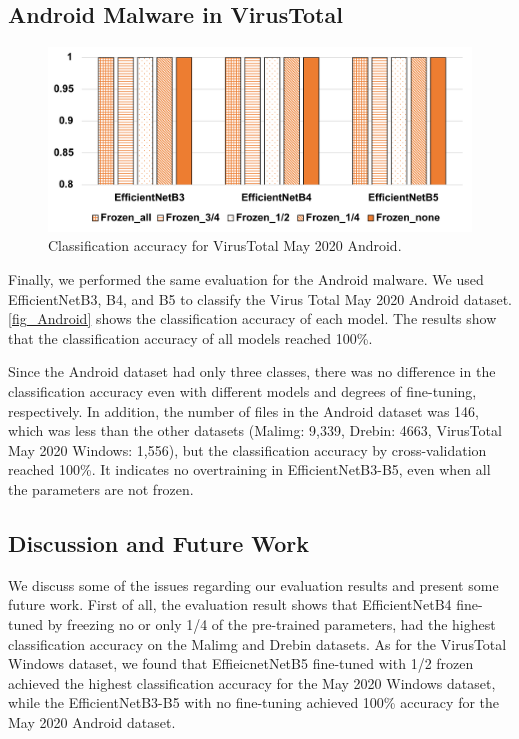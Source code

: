 \documentclass[conference]{IEEEtran}
\begin{document}
\subsection{Android Malware in VirusTotal}

\begin{figure}[t]
  \centering
  \includegraphics[width=\linewidth,clip]{Android.pdf}
  \caption{Classification accuracy for VirusTotal May 2020 Android.}
  \label{fig_Android}
\end{figure}

Finally, we performed the same evaluation for the Android malware.
We used EfficientNetB3, B4, and B5 to classify the Virus Total May 2020 Android dataset. 
\autoref{fig_Android} shows the classification accuracy of each model. The results show that the classification accuracy of all models reached 100\%. 

Since the Android dataset had only three classes, there was no difference in the classification accuracy even with different models and degrees of fine-tuning, respectively.
In addition, the number of files in the Android dataset was 146, which was less than the other datasets (Malimg: 9,339, Drebin: 4663, VirusTotal May 2020 Windows: 1,556), but the classification accuracy by cross-validation reached 100\%. It indicates no overtraining in EfficientNetB3-B5, even when all the parameters are not frozen.

\subsection{Discussion and Future Work}

We discuss some of the issues regarding our evaluation results and present some future work.
First of all, the evaluation result shows that EfficientNetB4 fine-tuned by freezing no or only 1/4 of the pre-trained parameters, had the highest classification accuracy on the Malimg and Drebin datasets.
As for the VirusTotal Windows dataset, we found that EffieicnetNetB5 fine-tuned with 1/2 frozen achieved the highest classification accuracy for the May 2020 Windows dataset, while the EfficientNetB3-B5 with no fine-tuning achieved 100\% accuracy for the May 2020 Android dataset.
\end{document}
